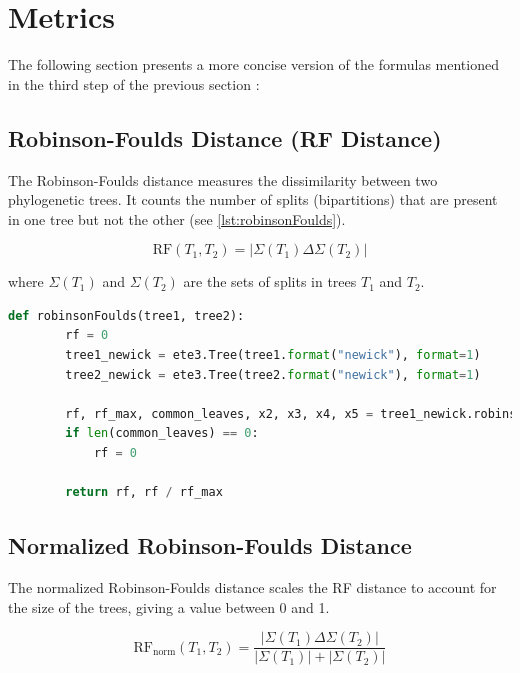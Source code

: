 \section{Metrics}\label{metrics}
The following section presents a more concise version of the formulas mentioned in the third step of the previous section :

\subsection{Robinson-Foulds Distance (RF Distance)}\label{RF}
The Robinson-Foulds distance measures the dissimilarity between two phylogenetic trees. It counts the number of splits (bipartitions) that are present in one tree but not the other (see \autoref{lst:robinsonFoulds}).

\begin{equation}
    \text{RF}(T_1, T_2) = | \Sigma(T_1) \Delta \Sigma(T_2) |
\end{equation}

where $\Sigma(T_1)$ and $\Sigma(T_2)$ are the sets of splits in trees $T_1$ and $T_2$.

\begin{lstlisting}[label=lst:robinsonFoulds,language=Python,caption=Python script for calculating the Robinson-Foulds distance using the ete3 package in the aPhyloGeo package]
    def robinsonFoulds(tree1, tree2):
        rf = 0
        tree1_newick = ete3.Tree(tree1.format("newick"), format=1)
        tree2_newick = ete3.Tree(tree2.format("newick"), format=1)

        rf, rf_max, common_leaves, x2, x3, x4, x5 = tree1_newick.robinson_foulds(tree2_newick, unrooted_trees=True)
        if len(common_leaves) == 0:
            rf = 0

        return rf, rf / rf_max
\end{lstlisting}


\subsection{Normalized Robinson-Foulds Distance}\label{RFnorm}
The normalized Robinson-Foulds distance scales the RF distance to account for the size of the trees, giving a value between 0 and 1.

\begin{equation}
    \text{RF}_{\text{norm}}(T_1, T_2) = \frac{| \Sigma(T_1) \Delta \Sigma(T_2) |}{| \Sigma(T_1) | + | \Sigma(T_2) |}
\end{equation}

